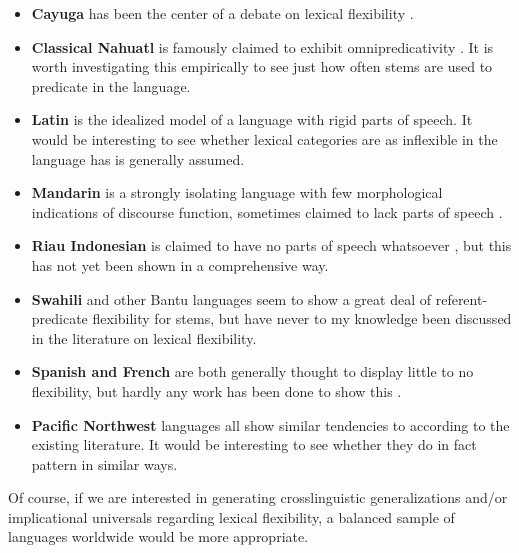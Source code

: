 \begin{itemize}

  \singlespacing

  \item \textbf{Cayuga} has been the center of a debate on lexical flexibility \parencites{Sasse1988}{Sasse1993}{Mithun2000}.

  \item \textbf{Classical Nahuatl} is famously claimed to exhibit omnipredicativity \parencites{Launey1994}{Launey2004}. It is worth investigating this empirically to see just how often stems are used to predicate in the language.

  \item \textbf{Latin} is the idealized model of a language with rigid parts of speech. It would be interesting to see whether lexical categories are as inflexible in the language has is generally assumed.

  \item \textbf{Mandarin} is a strongly isolating language with few morphological indications of discourse function, sometimes claimed to lack parts of speech \parencites{McDonald2013}{Sun2020}.

  \item \textbf{Riau Indonesian} is claimed to have no parts of speech whatsoever \parencite{Gil1994}, but this has not yet been shown in a comprehensive way.

  \item \textbf{Swahili} and other Bantu languages seem to show a great deal of referent-predicate flexibility for stems, but have never to my knowledge been discussed in the literature on lexical flexibility.

  \item \textbf{Spanish and French} are both generally thought to display little to no flexibility, but hardly any work has been done to show this .

  \item \textbf{Pacific Northwest} languages all show similar tendencies to  according to the existing literature. It would be interesting to see whether they do in fact pattern in similar ways.

\end{itemize}

\noindent Of course, if we are interested in generating crosslinguistic generalizations and/or implicational universals regarding lexical flexibility, a balanced sample of languages worldwide would be more appropriate.


